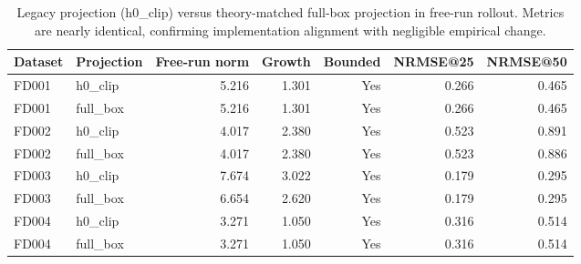 \begin{table}[t]
\centering
\caption{Legacy projection (h0\_clip) versus theory-matched full-box projection in free-run rollout. Metrics are nearly identical, confirming implementation alignment with negligible empirical change.}
\label{tab:theory_impl_rollout_compare}
\begin{tabular}{llrrrrr}
\toprule
Dataset & Projection & Free-run norm & Growth & Bounded & NRMSE@25 & NRMSE@50 \\
\midrule
FD001 & h0\_clip & 5.216 & 1.301 & Yes & 0.266 & 0.465 \\
FD001 & full\_box & 5.216 & 1.301 & Yes & 0.266 & 0.465 \\
FD002 & h0\_clip & 4.017 & 2.380 & Yes & 0.523 & 0.891 \\
FD002 & full\_box & 4.017 & 2.380 & Yes & 0.523 & 0.886 \\
FD003 & h0\_clip & 7.674 & 3.022 & Yes & 0.179 & 0.295 \\
FD003 & full\_box & 6.654 & 2.620 & Yes & 0.179 & 0.295 \\
FD004 & h0\_clip & 3.271 & 1.050 & Yes & 0.316 & 0.514 \\
FD004 & full\_box & 3.271 & 1.050 & Yes & 0.316 & 0.514 \\
\bottomrule
\end{tabular}
\end{table}